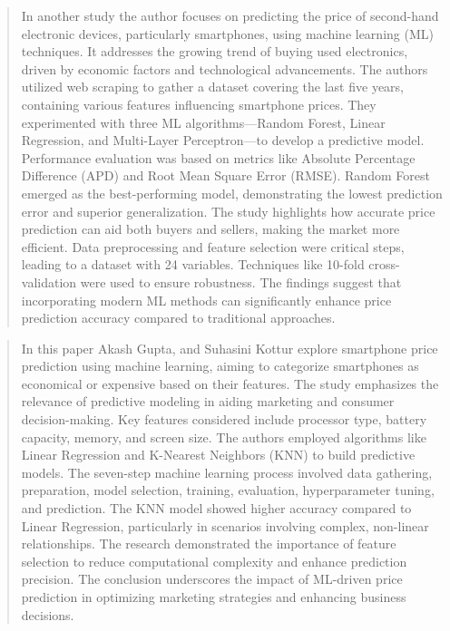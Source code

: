 \documentclass[12pt]{report}
\begin{document}
\begin{quotation}
  In another study \cite{abbasi2024} the author focuses on predicting the price of second-hand electronic devices, particularly smartphones, using machine learning (ML) techniques. It addresses the growing trend of buying used electronics, driven by economic factors and technological advancements. The authors utilized web scraping to gather a dataset covering the last five years, containing various features influencing smartphone prices. They experimented with three ML algorithms—Random Forest, Linear Regression, and Multi-Layer Perceptron—to develop a predictive model. Performance evaluation was based on metrics like Absolute Percentage Difference (APD) and Root Mean Square Error (RMSE). Random Forest emerged as the best-performing model, demonstrating the lowest prediction error and superior generalization. The study highlights how accurate price prediction can aid both buyers and sellers, making the market more efficient. Data preprocessing and feature selection were critical steps, leading to a dataset with 24 variables. Techniques like 10-fold cross-validation were used to ensure robustness. The findings suggest that incorporating modern ML methods can significantly enhance price prediction accuracy compared to traditional approaches.
\end{quotation}

\begin{quotation}
  In this paper  Akash Gupta, and Suhasini Kottur \cite{gupta2020} explore smartphone price prediction using machine learning, aiming to categorize smartphones as economical or expensive based on their features. The study emphasizes the relevance of predictive modeling in aiding marketing and consumer decision-making. Key features considered include processor type, battery capacity, memory, and screen size. The authors employed algorithms like Linear Regression and K-Nearest Neighbors (KNN) to build predictive models. The seven-step machine learning process involved data gathering, preparation, model selection, training, evaluation, hyperparameter tuning, and prediction. The KNN model showed higher accuracy compared to Linear Regression, particularly in scenarios involving complex, non-linear relationships. The research demonstrated the importance of feature selection to reduce computational complexity and enhance prediction precision. The conclusion underscores the impact of ML-driven price prediction in optimizing marketing strategies and enhancing business decisions.
\end{quotation}
\end{document}
